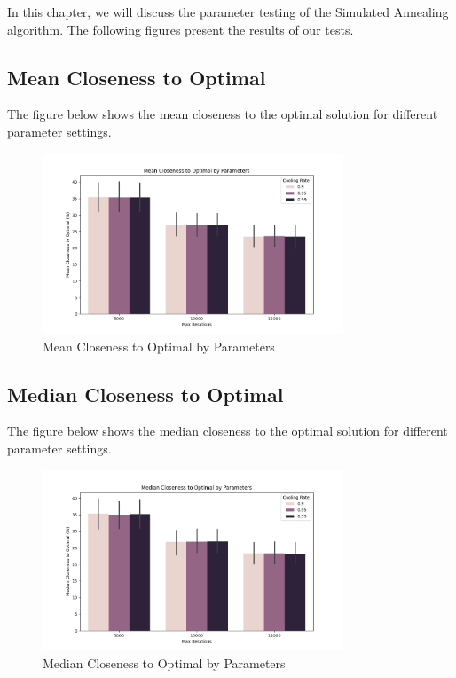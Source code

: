 \documentclass[
]{article}
\begin{document}
    In this chapter, we will discuss the parameter testing of the Simulated Annealing algorithm. The following figures present the results of our tests.

    \subsection{Mean Closeness to Optimal}\label{subsec:mean-closeness-to-optimal}

    The figure below shows the mean closeness to the optimal solution for different parameter settings.

    \begin{figure}[H]
        \centering
        \includegraphics[width=0.8\textwidth]{simulated_annealing/mean_closeness_to_optimal.png}
        \caption{Mean Closeness to Optimal by Parameters}
        \label{fig:mean_closeness}
    \end{figure}

    \subsection{Median Closeness to Optimal}\label{subsec:median-closeness-to-optimal}

    The figure below shows the median closeness to the optimal solution for different parameter settings.

    \begin{figure}[H]
        \centering
        \includegraphics[width=0.8\textwidth]{simulated_annealing/median_closeness_to_optimal.png}
        \caption{Median Closeness to Optimal by Parameters}
        \label{fig:median_closeness}
    \end{figure}
\end{document}
